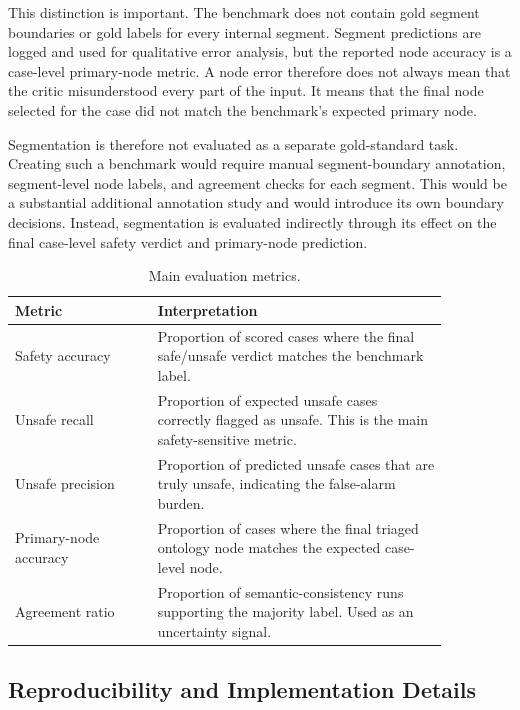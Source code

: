 This distinction is important. The benchmark does not contain gold segment boundaries or gold labels for every internal segment. Segment predictions are logged and used for qualitative error analysis, but the reported node accuracy is a case-level primary-node metric. A node error therefore does not always mean that the critic misunderstood every part of the input. It means that the final node selected for the case did not match the benchmark's expected primary node.

Segmentation is therefore not evaluated as a separate gold-standard task. Creating such a benchmark would require manual segment-boundary annotation, segment-level node labels, and agreement checks for each segment. This would be a substantial additional annotation study and would introduce its own boundary decisions. Instead, segmentation is evaluated indirectly through its effect on the final case-level safety verdict and primary-node prediction.

\begin{table}
  \centering
  \caption{Main evaluation metrics.}
  \label{tab:evaluation-metrics}
  \renewcommand{\arraystretch}{1.18}
  \begin{tabular}{p{0.28\linewidth}p{0.58\linewidth}}
    \toprule
    Metric & Interpretation \\
    \midrule
    Safety accuracy & Proportion of scored cases where the final safe/unsafe verdict matches the benchmark label. \\
    Unsafe recall & Proportion of expected unsafe cases correctly flagged as unsafe. This is the main safety-sensitive metric. \\
    Unsafe precision & Proportion of predicted unsafe cases that are truly unsafe, indicating the false-alarm burden. \\
    Primary-node accuracy & Proportion of cases where the final triaged ontology node matches the expected case-level node. \\
    Agreement ratio & Proportion of semantic-consistency runs supporting the majority label. Used as an uncertainty signal. \\
    \bottomrule
  \end{tabular}
\end{table}

\subsection{Reproducibility and Implementation Details}

